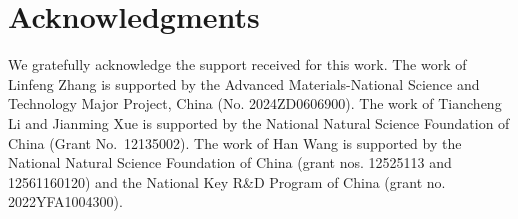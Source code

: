 \section{Acknowledgments}

We gratefully acknowledge the support received for this work.
The work of Linfeng Zhang is supported by the Advanced Materials-National Science and Technology Major Project, China (No. 2024ZD0606900).
The work of Tiancheng Li and Jianming Xue is supported by the National Natural Science Foundation of China (Grant No.~12135002).
The work of Han Wang is supported by the National Natural Science Foundation of China (grant nos. 12525113 and 12561160120) and the National Key R\&D Program of China (grant no. 2022YFA1004300).
